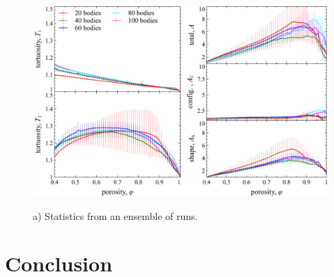 \documentclass[3p]{elsarticle}
\begin{document}
\begin{figure}%
\centering \label{fig6}
\includegraphics[width = 0.99 \textwidth]{./figs/fig6.pdf}
\caption{
a) Statistics from an ensemble of runs.
}
\end{figure}

\section{Conclusion}
\label{sec:conclusion}



\end{document}
